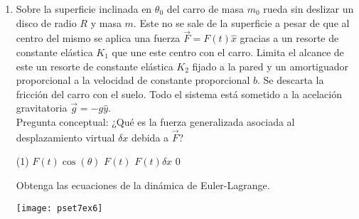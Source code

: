 \documentclass[11pt,spanish,a4paper]{article}
\begin{document}
\begin{enumerate}
\item
\begin{minipage}[t][7.5cm]{0.5\textwidth}
Sobre la superficie inclinada en $\theta_0$ del carro de masa $m_0$ rueda sin deslizar un disco de radio $R$ y masa $m$.
Este no se sale de la superficie a pesar de que al centro del mismo se aplica una fuerza $\vec{F}= F(t) \hat{x}$ gracias a un resorte de constante elástica $K_1$ que une este centro con el carro.
Limita el alcance de este un resorte de constante elástica $K_2$ fijado a la pared y un amortiguador proporcional a la velocidad de constante proporcional $b$.
Se descarta la fricción del carro con el suelo.
Todo el sistema está sometido a la acelación gravitatoria $\vec{g}= - g \hat{y}$.\\
Pregunta conceptual: ¿Qué es la fuerza generalizada asociada al desplazamiento virtual $\delta x$ debida a $\vec{F}$?\\
\begin{tasks}(1)
	\task $F(t) \cos(\theta)$
	\task $F(t)$
	\task $F(t) \delta x$
	\task $0$
\end{tasks}
Obtenga las ecuaciones de la dinámica de Euler-Lagrange. 
\end{minipage}
\begin{minipage}[c][0cm][t]{0.45\textwidth}
	\texttt{[image: pset7ex6]}
\end{minipage}




\end{enumerate}
\end{document}
